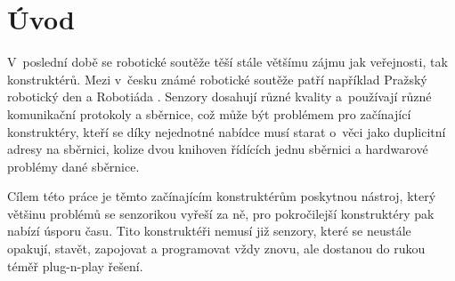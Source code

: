 \chapter*{Úvod}
V~poslední době se robotické soutěže těší stále většímu zájmu jak veřejnosti, tak konstruktérů.
Mezi v~česku známé robotické soutěže patří například Pražský robotický den \cite{Prague-robotic-day} a Robotiáda \cite{Robotiada}.
Senzory dosahují různé kvality a~používají různé komunikační protokoly a sběrnice, což může být problémem pro začínající konstruktéry, kteří se díky nejednotné nabídce musí starat o~věci jako duplicitní adresy na sběrnici, kolize dvou knihoven řídících jednu sběrnici a hardwarové problémy dané sběrnice.

Cílem této práce je těmto začínajícím konstruktérům poskytnou nástroj, který většinu problémů se senzorikou vyřeší za ně, pro pokročilejší konstruktéry pak nabízí úsporu času.
Tito konstruktéři nemusí již senzory, které se neustále opakují, stavět, zapojovat a programovat vždy znovu, ale dostanou do rukou téměř plug-n-play řešení.


\newpage